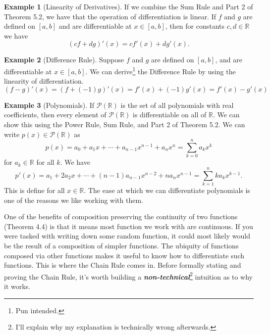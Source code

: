 \documentclass{article}
\newcommand{\R}{\mathbb{R}}
\theoremstyle{definition}
\newtheorem{example}{Example}[section]
\begin{document}
\begin{example}[Linearity of Derivatives] If we combine the Sum Rule and Part 2 of Theorem 5.2, we have that the operation of differentiation is linear. If $ f $ and $ g $ are defined on $ [a,b] $ and are differentiable at $ x\in[a,b] $, then for constants $ c,d\in\R $ we have
$$ (cf+dg)'(x)=cf'(x)+dg'(x).$$
\end{example}
\begin{example}[Difference Rule]
Suppose $ f $ and $ g $ are defined on $ [a,b] $, and are differentiable at $ x\in[a,b] $. We can derive\footnote{Pun intended.} the Difference Rule by using the linearity of differentiation.
$$(f-g)'(x)=(f+(-1)g)'(x)=f'(x)+(-1)g'(x)=f'(x)-g'(x) $$
\end{example}
\begin{example}[Polynomials]
	If $ \mathscr{P}(\R) $ is the set of all polynomials with real coefficients, then every element of $ \mathscr{P}(\R) $ is differentiable on all of $ \R $. We can show this using the Power Rule, Sum Rule, and Part 2 of Theorem 5.2. We can write $ p(x)\in\mathscr{P}(\R) $ as $$p(x)=a_0+a_1x+\cdots+a_{n-1}x^{n-1}+a_nx^n=\sum_{k=0}^{n}a_kx^k $$ for $ a_k\in\R $ for all $ k $. We have $$p'(x)=a_1+2a_2x+\cdots+(n-1)a_{n-1}x^{n-2}+na_nx^{n-1}=\sum_{k=1}^{n}ka_kx^{k-1}. $$ This is define for all $ x\in\R $. The ease at which we can differentiate polynomials is one of the reasons we like working with them.
\end{example}
One of the benefits of composition preserving the continuity of two functions (Theorem 4.4) is that it means most function we work with are continuous. If you were tasked with writing down some random function, it could most likely would be the result of a composition of simpler functions. The ubiquity of functions composed via other functions makes it useful to know how to differentiate such functions. This is where the Chain Rule comes in. Before formally stating and proving the Chain Rule, it's worth building a \textit{\textbf{non-technical}}\footnote{I'll explain why my explanation is technically wrong afterwards.} intuition as to why it works. 
\end{document}
